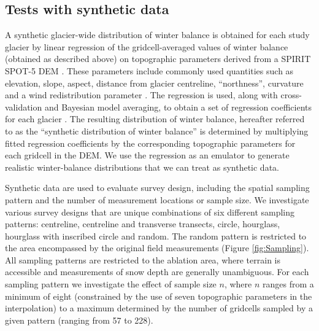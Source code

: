 \documentclass[twocolumn,letterpaper]{igs}
\begin{document}
\subsection{Tests with synthetic data}

A synthetic glacier-wide distribution of winter balance is obtained for each study glacier by linear regression of the gridcell-averaged values of winter balance (obtained as described above) on topographic parameters derived from a SPIRIT SPOT-5 DEM \citep{Korona2009}. These parameters include commonly used quantities such as elevation, slope, aspect, distance from glacier centreline, ``northness'', curvature and a wind redistribution parameter \citep[e.g.][]{McGrath2015}. The regression is used, along with cross-validation and Bayesian model averaging, to obtain a set of regression coefficients for each glacier \citep{Pulwicki2017}. The resulting distribution of winter balance, hereafter referred to as the ``synthetic distribution of winter balance'' is determined by multiplying fitted regression coefficients by the corresponding topographic parameters for each gridcell in the DEM. We use the regression as an emulator to generate realistic winter-balance distributions that we can treat as synthetic data. 

Synthetic data are used to evaluate survey design, including the spatial sampling pattern and the number of measurement locations or sample size. 
We investigate various survey designs that are unique combinations of six different sampling patterns: centreline, centreline and transverse transects, circle, hourglass, hourglass with inscribed circle and random. The random pattern is restricted to the area encompassed by the original field measurements (Figure \ref{fig:Sampling}). 
All sampling patterns are restricted to the ablation area, where terrain is accessible and measurements of snow depth are generally unambiguous. 
For each sampling pattern we investigate the effect of sample size $n$, where $n$ ranges from a minimum of eight (constrained by the use of seven topographic parameters in the interpolation) to a maximum determined by the number of gridcells sampled by a given pattern (ranging from 57 to 228). 
\end{document}
